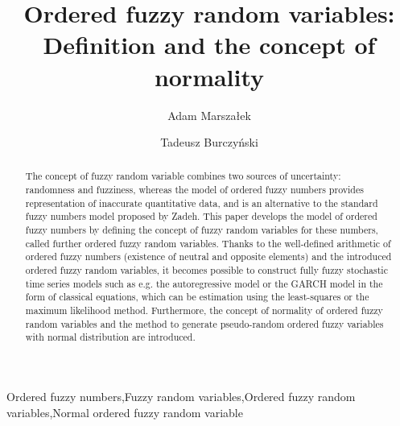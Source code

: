 \documentclass[review]{elsarticle}
\begin{document}
\begin{frontmatter}

\title{Ordered fuzzy random variables: Definition and the concept of normality}



\author[pk]{Adam Marsza\l ek}

\author[pk,ippt]{Tadeusz Burczy\'{n}ski}


\address[pk]{Institute of Computer Science, Computational Intelligence Department, Cracow University of Technology, Cracow, Poland}
\address[ippt]{Institute of Fundamental Technological Research, Polish Academy of Sciences, Warsaw, Poland}

\begin{abstract}
The concept of fuzzy random variable combines two sources of uncertainty: randomness and fuzziness, whereas the model of ordered fuzzy numbers provides representation of inaccurate quantitative data, and is an alternative to the standard fuzzy numbers model proposed by Zadeh. This paper develops the model of ordered fuzzy numbers by defining the concept of fuzzy random variables for these numbers, called further ordered fuzzy random variables. Thanks to the well-defined arithmetic of ordered fuzzy numbers (existence of neutral and opposite elements) and the introduced ordered fuzzy random variables, it becomes possible to construct fully fuzzy stochastic time series models such as e.g. the autoregressive model or the GARCH model in the form of classical equations, which can be estimation using the least-squares or the maximum likelihood method. Furthermore, the concept of normality of ordered fuzzy random variables and the method to generate pseudo-random ordered fuzzy variables  with normal distribution are introduced.
\end{abstract}

\begin{keyword}
Ordered fuzzy numbers\sep Fuzzy random variables\sep Ordered fuzzy random variables\sep Normal ordered fuzzy random variable
\end{keyword}

\end{frontmatter}

\linenumbers
\end{document}

